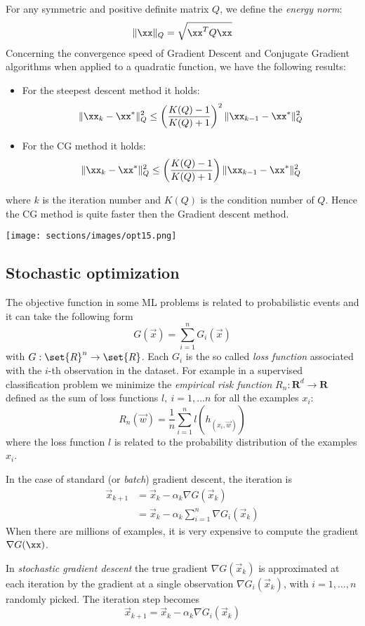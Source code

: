 For any symmetric and positive definite matrix $Q$, we define the \textit{energy norm}:
$$\| \xx \|_Q=\sqrt{\xx^T Q \xx}$$ 
Concerning the convergence speed of Gradient Descent and Conjugate Gradient algorithms when applied to a quadratic function, we have the following results:
\begin{itemize}
\item For the steepest descent method it holds:
    $$ \| \xx_k - \xx^* \|_Q^2 \leq \left(\frac{K(Q)-1}{K(Q)+1}\right)^2 \| \xx_{k-1} - \xx^*\|_Q^2$$
    \item For the CG method it holds:
    $$ \| \xx_k - \xx^* \|_Q^2 \leq \left(\frac{K(Q)-1}{K(Q)+1}\right) \| \xx_{k-1} - \xx^*\|_Q^2 $$
\end{itemize}
where $k$ is the iteration number and $K(Q)$ is the condition number of $Q$.
Hence the CG method is quite faster then the Gradient descent method.

\texttt{[image: sections/images/opt15.png]}

\subsection{Stochastic optimization}
The objective function in some ML  problems is related to probabilistic events and it can take the following form
$$ G(\vec{x}) = \sum_{i = 1}^{n}{G_i(\vec{x})} $$
with $G: \set{R}^n \rightarrow \set{R}$. Each $G_i$ is the so called \textit{loss function}  associated with the $i$-th observation in the dataset.
For example in a supervised classification problem we minimize the \textit{empirical risk function} $R_n:\mathbf{R}^d  \longrightarrow \mathbf{R}$ defined as the sum of loss functions $l, \ i=1, \ldots n$ for all the examples $x_i$:
$$R_n(\vec{w})=\frac{1}{n} \sum_{i=1}^n l(h_(x_i,\vec{w}))$$
where the loss function $l$ is related to the probability distribution of the examples $x_i$.


In the case of standard (or \textit{batch}) gradient descent, the iteration is
$$
    \begin{aligned}
        \vec{x}_{k+1} &= \vec{x}_k - \alpha_k\nabla{G}(\vec{x}_k)\\
        &= \vec{x}_k - \alpha_k\sum_{i=1}^{n}{\nabla{G_i}(\vec{x}_k)}
    \end{aligned}
$$
When there are millions of examples, it is very expensive  to compute the gradient $\nabla G(\xx)$.

In \textit{stochastic gradient descent} the true gradient $\nabla{G}(\vec{x}_k)$ is approximated at each iteration by the gradient at a single observation $\nabla{G_i}(\vec{x}_k)$, with $i = 1, \hdots, n$ randomly picked. The iteration step becomes
$$ \vec{x}_{k+1} = \vec{x}_k - \alpha_k\nabla{G_i}(\vec{x}_k) $$

